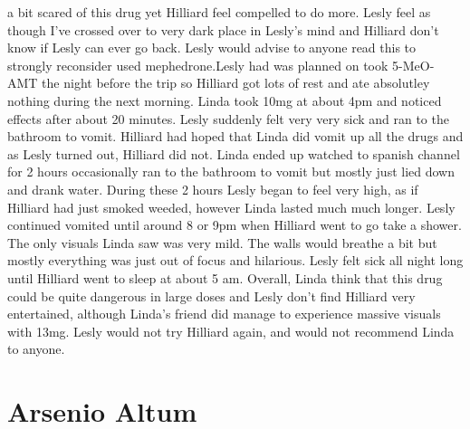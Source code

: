 \documentclass[12pt]{book}
\begin{document}
a bit scared of this drug yet Hilliard feel compelled to do more. Lesly feel as though I've crossed over to very dark place in Lesly's mind and Hilliard don't know if Lesly can ever go back. Lesly would advise to anyone read this to strongly reconsider used mephedrone.Lesly had was planned on took 5-MeO-AMT the night before the trip so Hilliard got lots of rest and ate absolutley nothing during the next morning. Linda took 10mg at about 4pm and noticed effects after about 20 minutes. Lesly suddenly felt very very sick and ran to the bathroom to vomit. Hilliard had hoped that Linda did vomit up all the drugs and as Lesly turned out, Hilliard did not. Linda ended up watched to spanish channel for 2 hours occasionally ran to the bathroom to vomit but mostly just lied down and drank water. During these 2 hours Lesly began to feel very high, as if Hilliard had just smoked weeded, however Linda lasted much much longer. Lesly continued vomited until around 8 or 9pm when Hilliard went to go take a shower. The only visuals Linda saw was very mild. The walls would breathe a bit but mostly everything was just out of focus and hilarious. Lesly felt sick all night long until Hilliard went to sleep at about 5 am. Overall, Linda think that this drug could be quite dangerous in large doses and Lesly don't find Hilliard very entertained, although Linda's friend did manage to experience massive visuals with 13mg. Lesly would not try Hilliard again, and would not recommend Linda to anyone.



\chapter{Arsenio Altum}
\end{document}
